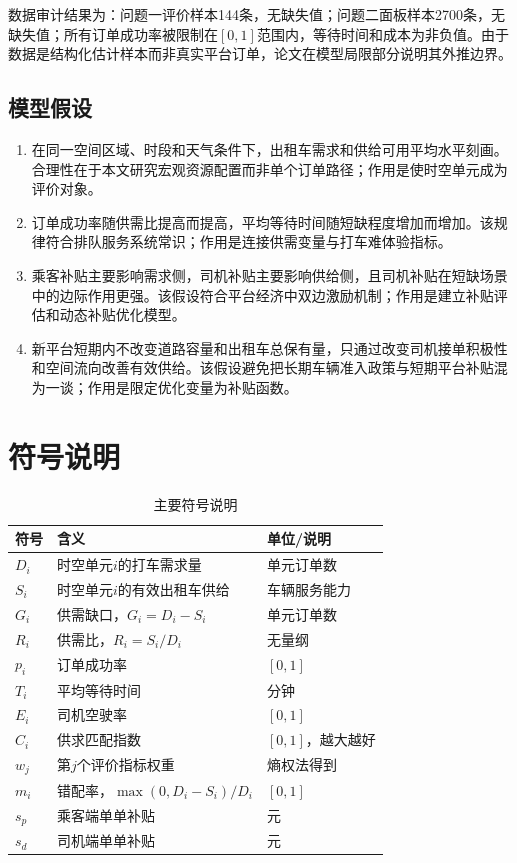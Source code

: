 \documentclass[12pt,a4paper]{ctexart}
\begin{document}
数据审计结果为：问题一评价样本144条，无缺失值；问题二面板样本2700条，无缺失值；所有订单成功率被限制在$[0,1]$范围内，等待时间和成本为非负值。由于数据是结构化估计样本而非真实平台订单，论文在模型局限部分说明其外推边界。

\subsection{模型假设}
\begin{enumerate}[label=假设\arabic*：]
  \item 在同一空间区域、时段和天气条件下，出租车需求和供给可用平均水平刻画。合理性在于本文研究宏观资源配置而非单个订单路径；作用是使时空单元成为评价对象。
  \item 订单成功率随供需比提高而提高，平均等待时间随短缺程度增加而增加。该规律符合排队服务系统常识；作用是连接供需变量与打车难体验指标。
  \item 乘客补贴主要影响需求侧，司机补贴主要影响供给侧，且司机补贴在短缺场景中的边际作用更强。该假设符合平台经济中双边激励机制；作用是建立补贴评估和动态补贴优化模型。
  \item 新平台短期内不改变道路容量和出租车总保有量，只通过改变司机接单积极性和空间流向改善有效供给。该假设避免把长期车辆准入政策与短期平台补贴混为一谈；作用是限定优化变量为补贴函数。
\end{enumerate}

\section{符号说明}
\begin{table}[H]
\centering
\caption{主要符号说明}
\begin{tabular}{lll}
\toprule
符号 & 含义 & 单位/说明\\
\midrule
$D_i$ & 时空单元$i$的打车需求量 & 单元订单数\\
$S_i$ & 时空单元$i$的有效出租车供给 & 车辆服务能力\\
$G_i$ & 供需缺口，$G_i=D_i-S_i$ & 单元订单数\\
$R_i$ & 供需比，$R_i=S_i/D_i$ & 无量纲\\
$p_i$ & 订单成功率 & $[0,1]$\\
$T_i$ & 平均等待时间 & 分钟\\
$E_i$ & 司机空驶率 & $[0,1]$\\
$C_i$ & 供求匹配指数 & $[0,1]$，越大越好\\
$w_j$ & 第$j$个评价指标权重 & 熵权法得到\\
$m_i$ & 错配率，$\max(0,D_i-S_i)/D_i$ & $[0,1]$\\
$s_p$ & 乘客端单单补贴 & 元\\
$s_d$ & 司机端单单补贴 & 元\\
\bottomrule
\end{tabular}
\end{table}
\end{document}
